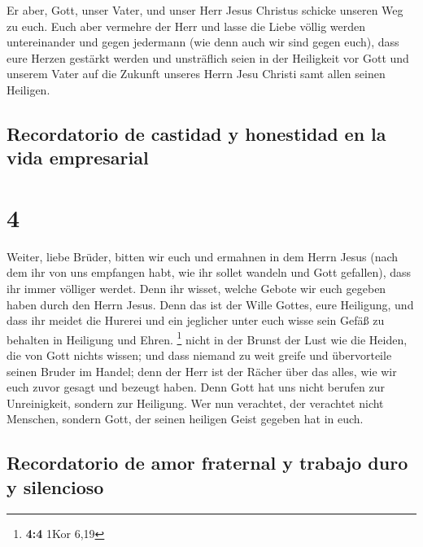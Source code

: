  Er aber, Gott, unser Vater, und unser Herr Jesus
Christus schicke unseren Weg zu euch.  Euch aber vermehre
der Herr und lasse die Liebe völlig werden untereinander und gegen
jedermann (wie denn auch wir sind gegen euch),  dass eure
Herzen gestärkt werden und unsträflich seien in der Heiligkeit vor Gott
und unserem Vater auf die Zukunft unseres Herrn Jesu Christi samt allen
seinen Heiligen.

\hypertarget{recordatorio-de-castidad-y-honestidad-en-la-vida-empresarial}{%
\subsection{Recordatorio de castidad y honestidad en la vida
empresarial}\label{recordatorio-de-castidad-y-honestidad-en-la-vida-empresarial}}

\hypertarget{section-3}{%
\section{4}\label{section-3}}

 Weiter, liebe Brüder, bitten wir euch und ermahnen in dem
Herrn Jesus (nach dem ihr von uns empfangen habt, wie ihr sollet wandeln
und Gott gefallen), dass ihr immer völliger werdet.  Denn
ihr wisset, welche Gebote wir euch gegeben haben durch den Herrn Jesus.
 Denn das ist der Wille Gottes, eure Heiligung, und dass
ihr meidet die Hurerei  und ein jeglicher unter euch wisse
sein Gefäß zu behalten in Heiligung und Ehren. \footnote{\textbf{4:4}
  1Kor 6,19}  nicht in der Brunst der Lust wie die Heiden,
die von Gott nichts wissen;  und dass niemand zu weit
greife und übervorteile seinen Bruder im Handel; denn der Herr ist der
Rächer über das alles, wie wir euch zuvor gesagt und bezeugt haben.
 Denn Gott hat uns nicht berufen zur Unreinigkeit, sondern
zur Heiligung.  Wer nun verachtet, der verachtet nicht
Menschen, sondern Gott, der seinen heiligen Geist gegeben hat in euch.

\hypertarget{recordatorio-de-amor-fraternal-y-trabajo-duro-y-silencioso}{%
\subsection{Recordatorio de amor fraternal y trabajo duro y
silencioso}\label{recordatorio-de-amor-fraternal-y-trabajo-duro-y-silencioso}}

